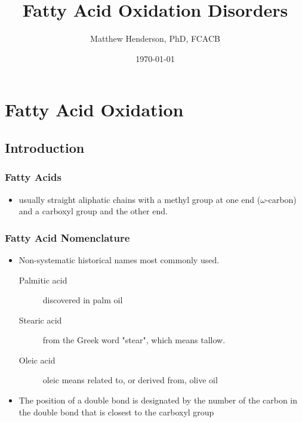 \documentclass{scrartcl}
\author{Matthew Henderson, PhD, FCACB}
\date{\today}
\title{Fatty Acid Oxidation Disorders}
\begin{document}
\maketitle
\setcounter{tocdepth}{2}
\tableofcontents


\section{Fatty Acid Oxidation}
\label{sec:org56b6c3c}
\subsection{Introduction}
\label{sec:org34ceded}
\subsubsection{Fatty Acids}
\label{sec:org34f60da}
\begin{itemize}
\item usually straight aliphatic chains with a methyl group at one end
(\(\omega\)-carbon) and a carboxyl group and the other end.
\end{itemize}


\subsubsection{Fatty Acid Nomenclature}
\label{sec:org27cc5e3}
\begin{itemize}
\item Non-systematic historical names most commonly used.
\begin{description}
\item[{Palmitic acid}] discovered in palm oil
\item[{Stearic acid}] from the Greek word "stear", which means tallow.
\item[{Oleic acid}] oleic means related to, or derived from, olive oil
\end{description}
\item The position of a double bond is designated by the number of the carbon in the double bond that is closest to the carboxyl group
\end{itemize}


\end{document}
